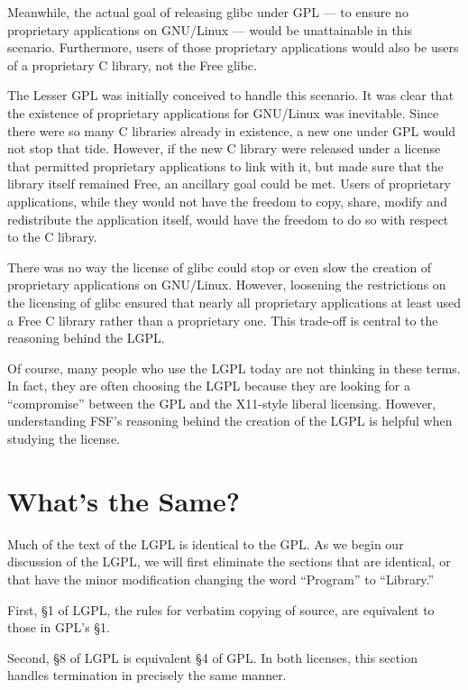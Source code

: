Meanwhile, the actual goal of releasing glibc under GPL --- to ensure no
proprietary applications on GNU/Linux --- would be unattainable in this
scenario. Furthermore, users of those proprietary applications would also
be users of a proprietary C library, not the Free glibc.

The Lesser GPL was initially conceived to handle this scenario. It was
clear that the existence of proprietary applications for GNU/Linux was
inevitable. Since there were so many C libraries already in existence, a
new one under GPL would not stop that tide. However, if the new C library
were released under a license that permitted proprietary applications
to link with it, but made sure that the library itself remained Free,
an ancillary goal could be met. Users of proprietary applications, while
they would not have the freedom to copy, share, modify and redistribute
the application itself, would have the freedom to do so with respect to
the C library.

There was no way the license of glibc could stop or even slow the creation
of proprietary applications on GNU/Linux. However, loosening the
restrictions on the licensing of glibc ensured that nearly all proprietary
applications at least used a Free C library rather than a proprietary one.
This trade-off is central to the reasoning behind the LGPL\@.

Of course, many people who use the LGPL today are not thinking in these
terms. In fact, they are often choosing the LGPL because they are looking
for a ``compromise'' between the GPL and the X11-style liberal licensing.
However, understanding FSF's reasoning behind the creation of the LGPL is
helpful when studying the license.


\section{What's the Same?}

Much of the text of the LGPL is identical to the GPL\@. As we begin our
discussion of the LGPL, we will first eliminate the sections that are
identical, or that have the minor modification changing the word
``Program'' to ``Library.''

First, \S 1 of LGPL, the rules for verbatim copying of source, are
equivalent to those in GPL's \S 1.

Second, \S 8 of LGPL is equivalent \S 4 of GPL\@. In both licenses, this
section handles termination in precisely the same manner.

